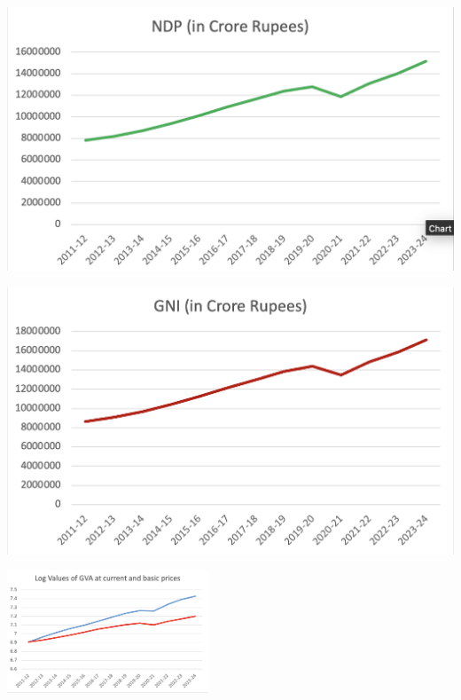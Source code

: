 \documentclass[a4paper,12pt]{extarticle} %
\begin{document}
\begin{minipage}{0.45\textwidth}
    \centering
    \includegraphics[width=\textwidth]{Q1/3.png}
  
\end{minipage}
\hfill
\begin{minipage}{0.45\textwidth}
    \centering
    \includegraphics[width=\textwidth]{Q1/4.png}
   
\end{minipage}
\begin{center}
\centering
    \includegraphics[width=0.45\textwidth]{Q1/5.png}
   
    
\end{center}
\end{document}
